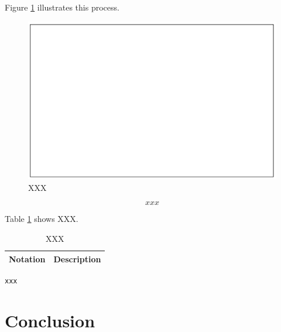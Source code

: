 \documentclass[11pt]{report}
\begin{document}
Figure \ref{empty1} illustrates this process.

\begin{figure}[H]
	\begin{center}
		\includegraphics[width=12cm]{empty}
	\end{center}
	\caption{XXX}
	\label{empty1}
\end{figure}

\begin{equation} 
xxx
\end{equation} 

Table \ref{table:xxx} shows XXX.

\begin{table}[H]
	\begin{center}
		\caption{XXX}
		\label{table:xxx}
		
		\begin{tabular}{|p{4cm}|p{8cm}|}
			\hline 
			\textbf{Notation} & \textbf{Description}\\
			\hline
            \hline
		\end{tabular}	
		
	\end{center}
\end{table}



{\small{	
\begin{verbatim}
xxx
\end{verbatim}
}}



\chapter{Conclusion}
\end{document}
